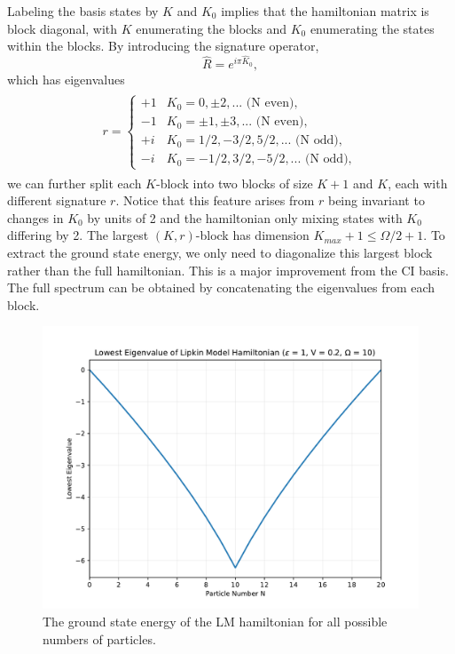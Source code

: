 \documentclass[prb,aps,twocolumn,showpacs,10pt]{revtex4-2}
\begin{document}
Labeling the basis states by $K$ and $K_0$ implies that the hamiltonian matrix is block diagonal, with $K$ enumerating the blocks and $K_0$ enumerating the states within the blocks. By introducing the signature operator,
\begin{equation}
\hat{R} = e^{i \pi \hat{K}_0},
\end{equation}
which has eigenvalues
\begin{align}
\begin{split}
 r = \begin{cases} 
      +1 & K_0 = 0, \pm 2, ... \text{ \ \ \ \ \ \ \ \ \ \ \ \ \ (N even)},\\
      -1 &K_0 = \pm 1, \pm 3, ... \text{ \ \ \ \ \ \ \ \ \ \ \ (N even)},\\
      +i & K_0 = 1/2, -3/2, 5/2, ... \text{ \ \ (N odd)},\\
      -i & K_0 = -1/2, 3/2, -5/2, ... \text{\ (N odd)},
   \end{cases}
\end{split}
\end{align}
we can further split each $K$-block into two blocks of size $K+1$ and $K$, each with different signature $r$. Notice that this feature arises from $r$ being invariant to changes in $K_0$ by units of 2 and the hamiltonian only mixing states with $K_0$ differing by 2. The largest $(K, r)$-block has dimension $K_{max}+1 \leq \Omega/2 +1$. To extract the ground state energy, we only need to diagonalize this largest block rather than the full hamiltonian. This is a major improvement from the CI basis. The full spectrum can be obtained by concatenating the eigenvalues from each block. 

\begin{figure}
  \includegraphics[width=\linewidth]{../figures/plot_lipkin_gs_N.pdf}
  \caption{The ground state energy of the LM hamiltonian for all possible numbers of particles.}
\end{figure}
\end{document}
